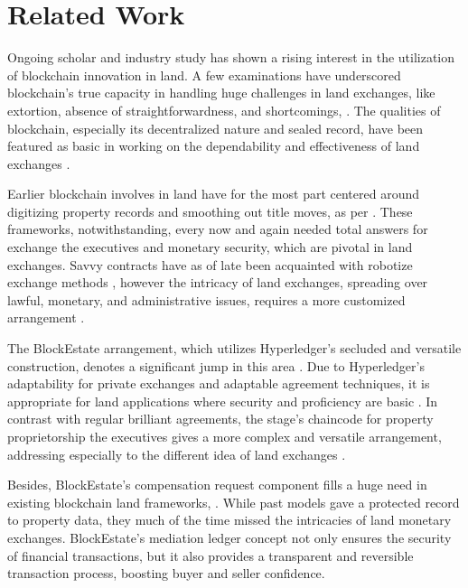 \documentclass[3p,times]{elsarticle}
\begin{document}
\section{Related Work}

Ongoing scholar and industry study \cite{podshivalov2022improving} has shown a rising interest in the utilization of blockchain innovation in land. A few examinations have underscored blockchain's true capacity in handling huge challenges in land exchanges, like extortion, absence of straightforwardness, and shortcomings, \cite{wouda2019blockchain}. The qualities of blockchain, especially its decentralized nature and sealed record, have been featured as basic in working on the dependability and effectiveness of land exchanges \cite{latifi2019blockchain}.

Earlier blockchain involves in land have for the most part centered around digitizing property records and smoothing out title moves, as per \cite{konashevych2020constraints}. These frameworks, notwithstanding, every now and again needed total answers for exchange the executives and monetary security, which are pivotal in land exchanges. Savvy contracts have as of late been acquainted with robotize exchange methods \cite{veuger2020dutch}, however the intricacy of land exchanges, spreading over lawful, monetary, and administrative issues, requires a more customized arrangement \cite{jeong2021implementation}.

The BlockEstate arrangement, which utilizes Hyperledger's secluded and versatile construction, denotes a significant jump in this area \cite{mittal2020real}. Due to Hyperledger's adaptability for private exchanges and adaptable agreement techniques, it is appropriate for land applications where security and proficiency are basic \cite{gupta2020tokenization}. In contrast with regular brilliant agreements, the stage's chaincode for property proprietorship the executives gives a more complex and versatile arrangement, addressing especially to the different idea of land exchanges \cite{huh2020verification}.

Besides, BlockEstate's compensation request component fills a huge need in existing blockchain land frameworks, \cite{pankratov2020blockchain}. While past models gave a protected record to property data, they much of the time missed the intricacies of land monetary exchanges. BlockEstate's mediation ledger concept not only ensures the security of financial transactions, but it also provides a transparent and reversible transaction process, boosting buyer and seller confidence.
\end{document}
